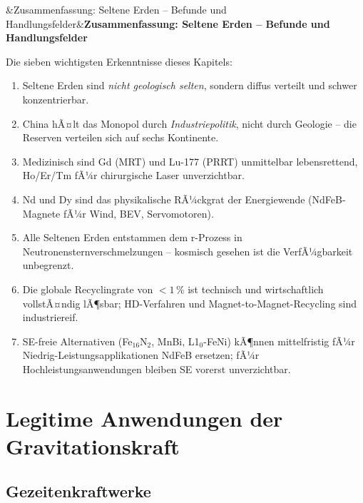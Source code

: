 ﻿\documentclass[12pt, a4paper]{report}
\newenvironment{hinweis}[1][]{%
  \begin{hinweisframe}\sloppy%
  \ifx&#1&\else\textbf{#1}\par\smallskip\fi}{\end{hinweisframe}}
\theoremstyle{definition}
\theoremstyle{remark}
\begin{document}
\begin{hinweis}[Zusammenfassung: Seltene Erden -- Befunde und Handlungsfelder]
  Die sieben wichtigsten Erkenntnisse dieses Kapitels:
  \begin{enumerate}[label=\arabic*., noitemsep]
    \item Seltene Erden sind \emph{nicht geologisch selten}, sondern diffus
          verteilt und schwer konzentrierbar.
    \item China hÃ¤lt das Monopol durch \emph{Industriepolitik}, nicht durch
          Geologie -- die Reserven verteilen sich auf sechs Kontinente.
    \item Medizinisch sind Gd (MRT) und Lu-177 (PRRT) unmittelbar
          lebensrettend, Ho/Er/Tm fÃ¼r chirurgische Laser unverzichtbar.
    \item Nd und Dy sind das physikalische RÃ¼ckgrat der Energiewende
          (NdFeB-Magnete fÃ¼r Wind, BEV, Servomotoren).
    \item Alle Seltenen Erden entstammen dem r-Prozess in
          Neutronensternverschmelzungen -- kosmisch gesehen ist die
          VerfÃ¼gbarkeit unbegrenzt.
    \item Die globale Recyclingrate von $<1\,\%$ ist technisch und
          wirtschaftlich vollstÃ¤ndig lÃ¶sbar; HD-Verfahren und
          Magnet-to-Magnet-Recycling sind industriereif.
    \item SE-freie Alternativen (Fe$_{16}$N$_2$, MnBi, L1$_0$-FeNi) kÃ¶nnen
          mittelfristig fÃ¼r Niedrig-Leistungsapplikationen NdFeB ersetzen;
          fÃ¼r Hochleistungsanwendungen bleiben SE vorerst unverzichtbar.
  \end{enumerate}
\end{hinweis}

\chapter{Legitime Anwendungen der Gravitationskraft}
\label{sec:legitim}

\section{Gezeitenkraftwerke}
\end{document}
